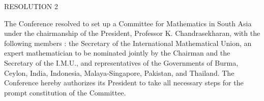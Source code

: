 \smallskip
\begin{center}
RESOLUTION 2
\end{center}
\smallskip

The Conference resolved to set up a Committee for Mathematics in South Asia under the chairmanship of the President, Professor K. Chandrasekharan, with the following members : the Secretary of the International Mathematical Union, an expert mathematician to be nominated jointly by the Chairman and the Secretary of the I.M.U., and representatives of the Governments of Burma, Ceylon, India, Indonesia, Malaya-Singapore, Pakistan, and Thailand. The Conference hereby authorizes its President to take all necessary steps for the prompt constitution of the Committee.


